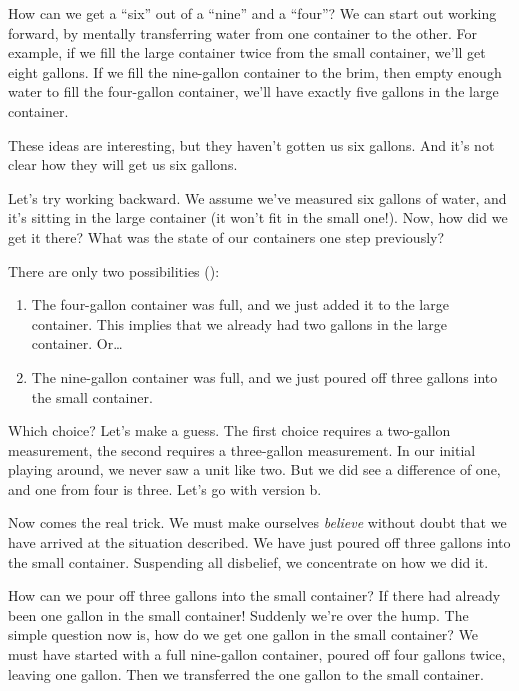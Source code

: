 How can we get a ``six'' out of a ``nine'' and a ``four''? We can
start out working forward, by mentally
transferring water from one container to the other. For example, if we
fill the large container twice from the small container, we'll get
eight gallons. If we fill the nine-gallon container to the brim, then
empty enough water to fill the four-gallon container, we'll have
exactly five gallons in the large container.

These ideas are interesting, but they haven't gotten us six gallons.
And it's not clear how they will get us six gallons.

Let's try working backward.
We assume we've measured six gallons
of water, and it's sitting in the large container (it won't fit in the
small one!). Now, how did we get it there? What was the state of our
containers one step previously?

There are only two possibilities ():
\begin{enumerate}
\item The four-gallon container was full, and we just added it to the large
   container. This implies that we already had two gallons in the large
   container. Or\dots{}
\item The nine-gallon container was full, and we just poured off three gallons
   into the small container.
\end{enumerate}
Which choice? Let's make a guess. The first choice requires a two-gallon
measurement, the second requires a three-gallon measurement. In our initial
playing around, we never saw a unit like two. But we did see a difference
of one, and one from four is three. Let's go with version b.

Now comes the real trick. We must make ourselves \emph{believe} without
doubt that we have arrived at the situation described. We have just
poured off three gallons into the small container. Suspending all disbelief,
we concentrate on how we did it.

How can we pour off three gallons into the small container? If there
had already been one gallon in the small container! Suddenly we're over
the hump. The simple question now is, how do we get one gallon in the
small container? We must have started with a full nine-gallon container,
poured off four gallons twice, leaving one gallon. Then we transferred the
one gallon to the small container.

